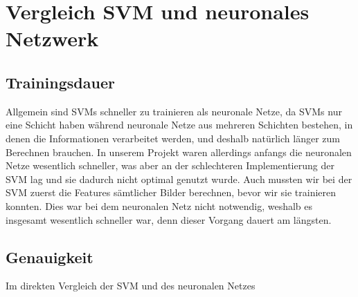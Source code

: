 \section{Vergleich SVM und neuronales Netzwerk}

\subsection{Trainingsdauer}

Allgemein sind SVMs schneller zu trainieren als neuronale Netze, da SVMs nur eine Schicht haben während neuronale Netze aus mehreren Schichten bestehen, in denen die Informationen verarbeitet werden, und deshalb natürlich länger zum Berechnen brauchen. In unserem Projekt waren allerdings anfangs die neuronalen Netze wesentlich schneller, was aber an der schlechteren Implementierung der SVM lag und sie dadurch nicht optimal genutzt wurde. Auch mussten wir bei der SVM zuerst die Features sämtlicher Bilder berechnen, bevor wir sie trainieren konnten. Dies war bei dem neuronalen Netz nicht notwendig, weshalb es insgesamt wesentlich schneller war, denn dieser Vorgang dauert am längsten.

\subsection{Genauigkeit}
Im direkten Vergleich der SVM und des neuronalen Netzes 